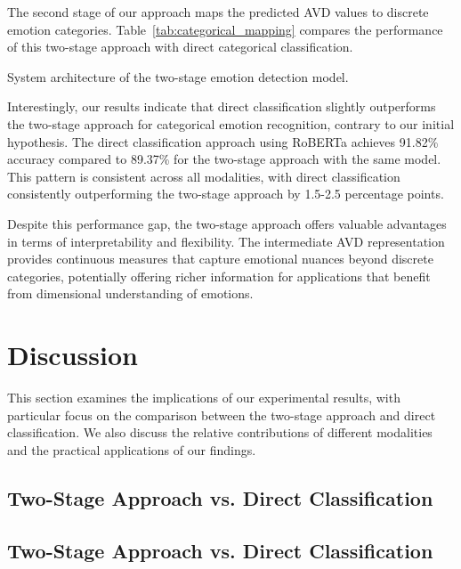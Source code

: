 \documentclass[12pt]{article}
\begin{document}
The second stage of our approach maps the predicted AVD values to discrete emotion categories. Table~\ref{tab:categorical_mapping} compares the performance of this two-stage approach with direct categorical classification.

\begin{table}[h]
\centering
\caption{System architecture of the two-stage emotion detection model.}

\end{table}

Interestingly, our results indicate that direct classification slightly outperforms the two-stage approach for categorical emotion recognition, contrary to our initial hypothesis. The direct classification approach using RoBERTa achieves 91.82\% accuracy compared to 89.37\% for the two-stage approach with the same model. This pattern is consistent across all modalities, with direct classification consistently outperforming the two-stage approach by 1.5-2.5 percentage points.

Despite this performance gap, the two-stage approach offers valuable advantages in terms of interpretability and flexibility. The intermediate AVD representation provides continuous measures that capture emotional nuances beyond discrete categories, potentially offering richer information for applications that benefit from dimensional understanding of emotions.

\section{Discussion}
\label{sec:discussion}

This section examines the implications of our experimental results, with particular focus on the comparison between the two-stage approach and direct classification. We also discuss the relative contributions of different modalities and the practical applications of our findings.

\subsection{Two-Stage Approach vs. Direct Classification}
\subsection{Two-Stage Approach vs. Direct Classification}
\end{document}
